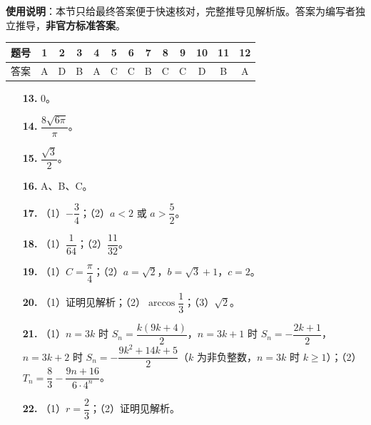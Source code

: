 
\begin{gknotice}
\textbf{使用说明}：本节只给最终答案便于快速核对，完整推导见解析版。答案为编写者独立推导，\textbf{非官方标准答案}。
\end{gknotice}

\begin{center}\begin{tabular}{ccccccccccccc}
\toprule
题号 & 1 & 2 & 3 & 4 & 5 & 6 & 7 & 8 & 9 & 10 & 11 & 12 \\
\midrule
答案 & A & D & B & A & C & C & B & C & C & D & B & A \\
\bottomrule
\end{tabular}\end{center}

\begin{itemize}[leftmargin=2.6em]
  \item[\textbf{13.}] $0$。
  \item[\textbf{14.}] $\dfrac{8\sqrt{6\pi}}{\pi}$。
  \item[\textbf{15.}] $\dfrac{\sqrt3}{2}$。
  \item[\textbf{16.}] A、B、C。
\end{itemize}

\begin{itemize}[leftmargin=2.6em]
  \item[\textbf{17.}] （1）$-\dfrac34$；（2）$a<2$ 或 $a>\dfrac52$。
  \item[\textbf{18.}] （1）$\dfrac1{64}$；（2）$\dfrac{11}{32}$。
  \item[\textbf{19.}] （1）$C=\dfrac{\pi}{4}$；（2）$a=\sqrt2$，$b=\sqrt3+1$，$c=2$。
  \item[\textbf{20.}] （1）证明见解析；（2）$\arccos\dfrac13$；（3）$\sqrt2$。
  \item[\textbf{21.}] （1）$n=3k$ 时 $S_n=\dfrac{k(9k+4)}{2}$，$n=3k+1$ 时 $S_n=-\dfrac{2k+1}{2}$，$n=3k+2$ 时 $S_n=-\dfrac{9k^2+14k+5}{2}$（$k$ 为非负整数，$n=3k$ 时 $k\geqslant1$）；（2）$T_n=\dfrac83-\dfrac{9n+16}{6\cdot4^n}$。
  \item[\textbf{22.}] （1）$r=\dfrac23$；（2）证明见解析。
\end{itemize}
